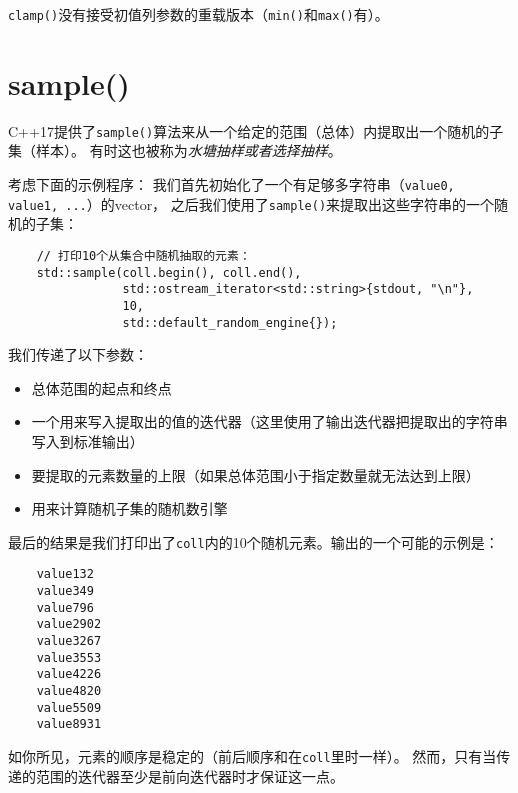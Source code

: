 \texttt{clamp()}没有接受初值列参数的重载版本（\texttt{min()}和\texttt{max()}有）。


\section{sample()}
C++17提供了\texttt{sample()}算法来从一个给定的范围（总体）内提取出一个随机的子集（样本）。
有时这也被称为\emph{水塘抽样或者选择抽样}。

考虑下面的示例程序：
我们首先初始化了一个有足够多字符串（\texttt{value0, value1, ...}）的vector，
之后我们使用了\texttt{sample()}来提取出这些字符串的一个随机的子集：
\begin{lstlisting}
    // 打印10个从集合中随机抽取的元素：
    std::sample(coll.begin(), coll.end(),
                std::ostream_iterator<std::string>{stdout, "\n"},
                10,
                std::default_random_engine{});
\end{lstlisting}
我们传递了以下参数：
\begin{itemize}
    \item 总体范围的起点和终点
    \item 一个用来写入提取出的值的迭代器（这里使用了输出迭代器把提取出的字符串写入到标准输出）
    \item 要提取的元素数量的上限（如果总体范围小于指定数量就无法达到上限）
    \item 用来计算随机子集的随机数引擎
\end{itemize}
最后的结果是我们打印出了\texttt{coll}内的10个随机元素。输出的一个可能的示例是：
\begin{lstlisting}
    value132
    value349
    value796
    value2902
    value3267
    value3553
    value4226
    value4820
    value5509
    value8931
\end{lstlisting}
如你所见，元素的顺序是稳定的（前后顺序和在\texttt{coll}里时一样）。
然而，只有当传递的范围的迭代器至少是前向迭代器时才保证这一点。

